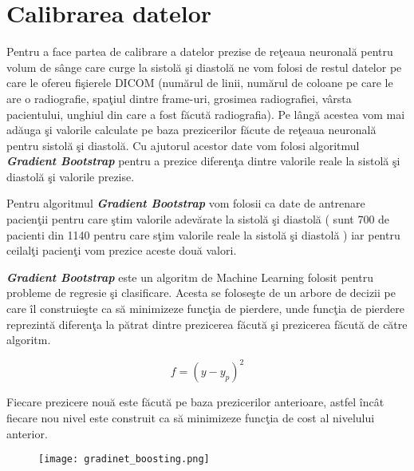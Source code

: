 \section{Calibrarea datelor}

Pentru a face partea de calibrare a datelor prezise de re\c{t}eaua neuronal\u{a} pentru volum de s\^{a}nge care curge la sistol\u{a} \c{s}i diastol\u{a} ne vom folosi de restul datelor pe care le ofereu fi\c{s}ierele DICOM (num\u{a}rul de linii, num\u{a}rul de coloane pe care le are o radiografie, spa\c{t}iul dintre frame-uri, grosimea radiografiei, v\^{a}rsta pacientului, unghiul din care a fost f\u{a}cut\u{a} radiografia). Pe l\^{a}ng\u{a} acestea vom mai ad\u{a}uga \c{s}i valorile calculate pe baza prezicerilor f\u{a}cute de re\c{t}eaua neuronal\u{a} pentru sistol\u{a} \c{s}i diastol\u{a}. Cu ajutorul acestor date vom folosi algoritmul \textbf{\textit{Gradient Bootstrap}} pentru a prezice diferen\c{t}a dintre valorile reale la sistol\u{a} \c{s}i diastol\u{a} \c{s}i valorile prezise.

\par

Pentru algoritmul \textbf{\textit{Gradient Bootstrap}} vom folosii ca date de antrenare pacien\c{t}ii pentru care \c{s}tim valorile adev\u{a}rate la sistol\u{a} \c{s}i diastol\u{a} ( sunt 700 de pacienti din 1140 pentru care s\c{t}im valorile reale la sistol\u{a} \c{s}i diastol\u{a} ) iar pentru ceilal\c{t}i pacien\c{t}i vom prezice aceste dou\u{a} valori.

\par

\textbf{\textit{Gradient Bootstrap}} este un algoritm de Machine Learning folosit pentru probleme de regresie \c{s}i clasificare. Acesta se folose\c{s}te de un arbore de decizii pe care \^{i}l construie\c{s}te ca s\u{a} minimizeze func\c{t}ia de pierdere, unde func\c{t}ia de pierdere reprezint\u{a} diferen\c{t}a la p\u{a}trat dintre prezicerea f\u{a}cut\u{a} \c{s}i prezicerea f\u{a}cut\u{a} de c\u{a}tre algoritm.

$$ f = (y - y_p )^2 $$

Fiecare prezicere nou\u{a} este f\u{a}cut\u{a} pe baza prezicerilor anterioare, astfel \^{i}nc\^{a}t fiecare nou nivel este construit ca s\u{a} minimizeze func\c{t}ia de cost al nivelului anterior.

\begin{figure}[h!]
  \center
  \texttt{[image: gradinet\_boosting.png]}  
\end{figure}

